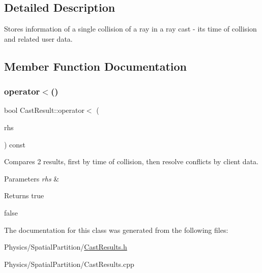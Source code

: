 \subsection{Detailed Description}
Stores information of a single collision of a ray in a ray cast -\/ its time of collision and related user data. 

\subsection{Member Function Documentation}
\mbox{\label{classCastResult_aa93d9222beba3f31dafeba8761ab0979}} 
\subsubsection{\texorpdfstring{operator$<$()}{operator<()}}
{\footnotesize\ttfamily bool Cast\+Result\+::operator$<$ (\begin{DoxyParamCaption}\item[{const \hyperlink{classCastResult}{Cast\+Result} \&}]{rhs }\end{DoxyParamCaption}) const}



Compares 2 results, first by time of collision, then resolve conflicts by client data. 


\begin{DoxyParams}{Parameters}
{\em rhs} & \\
\hline
\end{DoxyParams}
\begin{DoxyReturn}{Returns}
true 

false 
\end{DoxyReturn}


The documentation for this class was generated from the following files\+:\begin{DoxyCompactItemize}
\item 
Physics/\+Spatial\+Partition/\hyperlink{CastResults_8h}{Cast\+Results.\+h}\item 
Physics/\+Spatial\+Partition/Cast\+Results.\+cpp\end{DoxyCompactItemize}
